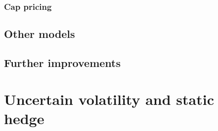 \documentclass[11pt]{article} %
\begin{document}
\subsubsection{Cap pricing}

\subsection{Other models}





\subsection{Further improvements}


\section{Uncertain volatility and static hedge}
\end{document}
